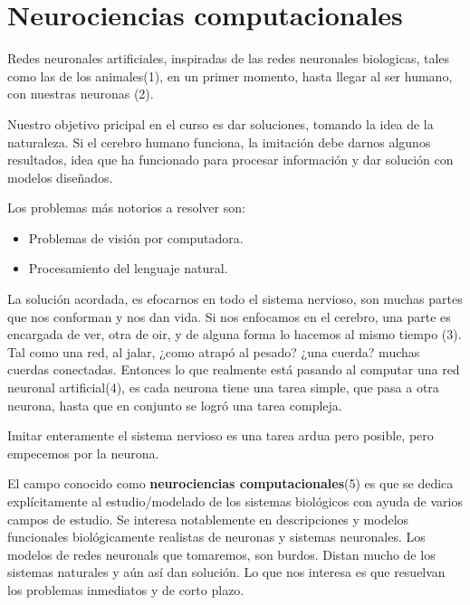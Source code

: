 \section{Neurociencias computacionales}

Redes neuronales artificiales, inspiradas de las redes neuronales biologicas, tales como las de los animales(1), en un primer momento, hasta llegar al ser humano, con nuestras neuronas (2). 

Nuestro objetivo pricipal en el curso es dar soluciones, tomando la idea de la naturaleza. Si el cerebro humano funciona, la imitación debe darnos algunos resultados, idea que ha funcionado para procesar información y dar solución con modelos diseñados.

Los problemas más notorios a resolver son: 
\begin{itemize}
\item Problemas de visión por computadora.
\item Procesamiento del lenguaje natural.
\end{itemize}

La solución acordada, es efocarnos en todo el sistema nervioso, son muchas partes que nos conforman y nos dan vida. Si nos enfocamos en el cerebro, una parte es encargada de ver, otra de oir, y de alguna forma lo hacemos al mismo tiempo (3). Tal como una red, al jalar, ¿como atrapó al pesado? ¿una cuerda? muchas cuerdas conectadas. Entonces lo que realmente está pasando al computar una red neuronal artificial(4), es cada neurona tiene una tarea simple, que pasa a otra neurona, hasta que en conjunto se logró una tarea compleja. 

Imitar enteramente el sistema nervioso es una tarea ardua pero posible, 
pero empecemos por la neurona.

El campo conocido como \textbf{neurociencias computacionales}(5) es que se dedica explícitamente al estudio/modelado de los sistemas biológicos con ayuda de varios campos de estudio. Se interesa notablemente en descripciones y modelos funcionales biológicamente realistas de neuronas y sistemas neuronales. 
Los modelos de redes neuronals que tomaremos, son burdos. Distan mucho de los sistemas naturales y aún así dan solución. Lo que nos interesa es que resuelvan los problemas inmediatos y de corto plazo. 

